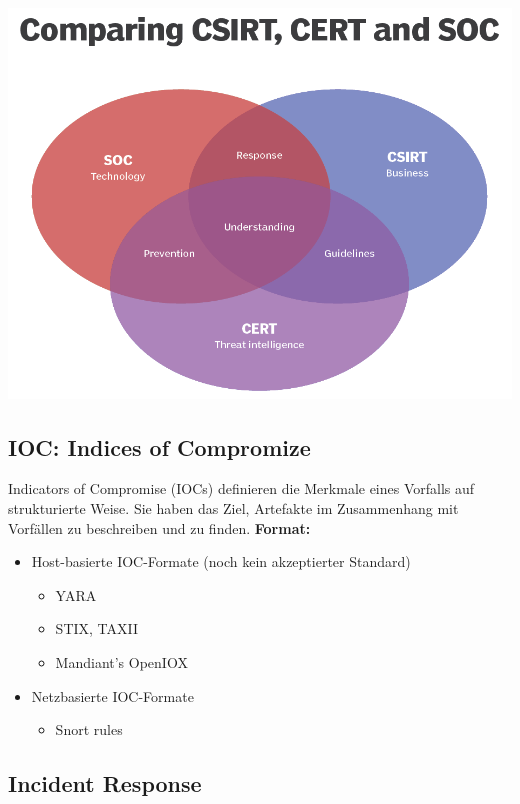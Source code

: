 \begin{center}
    \vspace{-8pt}
    \includegraphics[width=0.8\linewidth]{./img/02-begriffe/soc_cert_csirt}
    \vspace{-8pt}
\end{center}

\subsection{IOC: Indices of Compromize}
Indicators of Compromise (IOCs) definieren die Merkmale eines Vorfalls auf strukturierte Weise. Sie haben das Ziel, Artefakte im Zusammenhang mit Vorfällen zu beschreiben und zu finden.
\textbf{Format:}
\begin{itemize}
    \item Host-basierte IOC-Formate (noch kein akzeptierter Standard)
    \begin{itemize}
        \item YARA
        \item STIX, TAXII
        \item Mandiant's OpenIOX
    \end{itemize}
    \item Netzbasierte IOC-Formate
    \begin{itemize}
        \item Snort rules
    \end{itemize}
\end{itemize}

\subsection{Incident Response}
